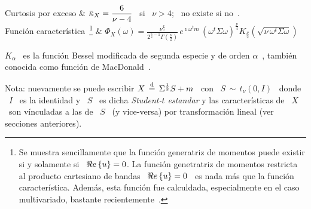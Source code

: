 \begin{center}
\begin{tabular}
\hline
Curtosis por exceso & $\displaystyle \widebar{\kappa}_X = \frac{6}{\nu-4}$ \ si
\ $\nu > 4$; \ no existe si no~.\\[2mm]
\hline
%
Funci\'on caracter\'istica~\footnote{Se muestra sencillamente que la funci\'on
generatriz de momentos puede existir si y solamente si \ $\Re e \left\{ u \right\} = 0$. La
funci\'on genetratriz de momentos restricta al producto cartesiano de bandas \
$\Re e \left\{ u \right\} = 0$ \ es nada m\'as que la funci\'on caracter\'istica. Adem\'as, esta
funci\'on fue calculdada, especialmente en el caso multivariado, bastante
recientemente~\cite{Sut86, SonPar84, Hur95, KibJoa06}.} & $\displaystyle \Phi_X(\omega)
= \frac{\nu^{\frac{\nu}{4}}}{2^{\frac{\nu}{2}-1} \Gamma\left( \frac{\nu}{2}
\right)} \, e^{\imath \omega^t m} \, \left( \omega^t \Sigma \omega \right)^{\frac{\nu}{4}}
K_{\frac{\nu}{2}}\left( \sqrt{\nu \, \omega^t \Sigma \omega} \right) $\\[2mm]
\hline
\end{tabular}
\end{center}
%
$K_\alpha$ \  es la funci\'on  Bessel modificada de  segunda especie y  de orden
$\alpha$~\cite{AbrSte70,  GraRyz15, Wat22,  GraMat95},  tambi\'en conocida  como
funci\'on de MacDonald~\cite{Mac98}.

Nota: nuevamente se puede escribir $X \, \stackrel{\mathrm{d}}{=} \, \Sigma^{\frac12} S + m$ \ con
\ $S \, \sim \,  t_\nu(0,I)$ \ donde \ $I$ \ es la identidad  y \ $S$ \ es dicha
{\em Student-$t$ estandar}  y las caracter\'isticas de \ $X$  \ son v\'inculadas a
las  de  \ $S$  \  (y vice-versa)  por  transformaci\'on  lineal (ver  secciones
anteriores).


